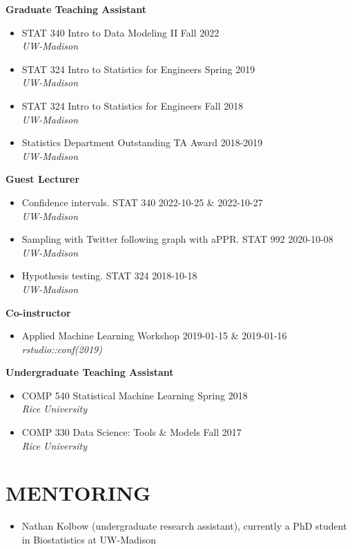 \documentclass[11pt]{article}
\begin{document}
\textbf{Graduate Teaching Assistant}
\begin{itemize}
    \item STAT 340 Intro to Data Modeling II \hfill Fall 2022 \\ \emph{\small UW-Madison}
    \item STAT 324 Intro to Statistics for Engineers \hfill Spring 2019 \\ \emph{\small UW-Madison}
    \item STAT 324 Intro to Statistics for Engineers \hfill Fall 2018 \\ \emph{\small UW-Madison}
    \item Statistics Department Outstanding TA Award \hfill 2018-2019 \\ \emph{\small UW-Madison}
\end{itemize}

\textbf{Guest Lecturer}
\begin{itemize}
    \item Confidence intervals. STAT 340 \hfill 2022-10-25 \& 2022-10-27 \\ \emph{\small UW-Madison}
    \item Sampling with Twitter following graph with aPPR. STAT 992 \hfill 2020-10-08 \\ \emph{\small UW-Madison}
    \item Hypothesis testing. STAT 324 \hfill 2018-10-18 \\ \emph{\small UW-Madison}
\end{itemize}

\textbf{Co-instructor}
\begin{itemize}
    \item Applied Machine Learning Workshop \hfill 2019-01-15 \& 2019-01-16 \\ \emph{\small rstudio::conf(2019)}
\end{itemize}

\textbf{Undergraduate Teaching Assistant}
\begin{itemize}
    \item COMP 540 Statistical Machine Learning \hfill Spring 2018 \\ \emph{\small Rice University}
    \item COMP 330 Data Science: Tools \& Models \hfill Fall 2017 \\ \emph{\small Rice University}
\end{itemize}

\section*{MENTORING}

\begin{itemize}
    \item Nathan Kolbow (undergraduate research assistant), currently a PhD student in Biostatistics at UW-Madison
\end{itemize}
\end{document}
